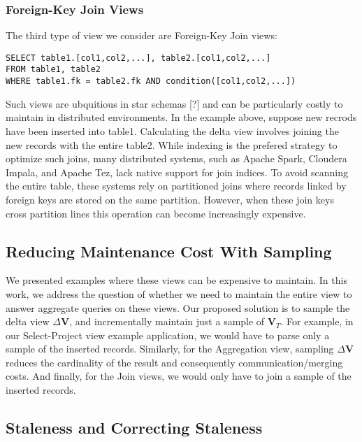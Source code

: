 \subsubsection{Foreign-Key Join Views}

The third type of view we consider are Foreign-Key Join views:

\begin{lstlisting}
SELECT table1.[col1,col2,...], table2.[col1,col2,...]
FROM table1, table2 
WHERE table1.fk = table2.fk AND condition([col1,col2,...]) 
\end{lstlisting}


Such views are ubquitious in star schemas {[}?{]} and can be particularly
costly to maintain in distributed environments. In the example above,
suppose new recrods have been inserted into table1. Calculating the
delta view involves joining the new records with the entire table2.
While indexing is the prefered strategy to optimize such joins, many
distributed systems, such as Apache Spark, Cloudera Impala, and Apache
Tez, lack native support for join indices. To avoid scanning the entire
table, these systems rely on partitioned joins where records linked
by foreign keys are stored on the same partition. However, when these
join keys cross partition lines this operation can become increasingly
expensive.


\subsection{Reducing Maintenance Cost With Sampling}

We presented examples where these views can be expensive to maintain.
In this work, we address the question of whether we need to maintain
the entire view to answer aggregate queries on these views. Our proposed
solution is to sample the delta view $\Delta\textbf{V}$, and incrementally
maintain just a sample of $\textbf{V}_{T}$. For example, in our Select-Project
view example application, we would have to parse only a sample of
the inserted records. Similarly, for the Aggregation view, sampling
$\Delta\textbf{V}$ reduces the cardinality of the result and consequently
communication/merging costs. And finally, for the Join views, we would
only have to join a sample of the inserted records.


\subsection{Staleness and Correcting Staleness}

